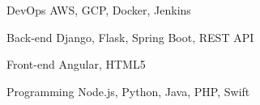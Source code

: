 

\begin{cvskills}

  \cvskill
    {DevOps} %
    {AWS, GCP, Docker, Jenkins} %

  \cvskill
    {Back-end} %
    {Django, Flask, Spring Boot, REST API} %

  \cvskill
    {Front-end} %
    {Angular, HTML5} %

  \cvskill
    {Programming} %
    {Node.js, Python, Java, PHP, Swift} %


\end{cvskills}
